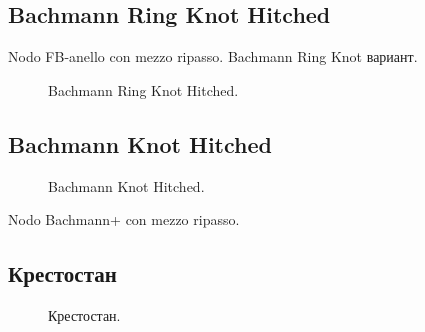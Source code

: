 \subsection{Bachmann Ring Knot Hitched}

Nodo FB-anello con mezzo ripasso. Bachmann Ring Knot вариант.

\begin{figure}[H]\centering
	\begin{minipage}{1\linewidth}
		\begin{center}
			\tcbox[enhanced jigsaw,colframe=black,opacityframe=0.5,opacityback=0.5]
			{\centering{}}
		\end{center}
	\end{minipage}
\caption{Bachmann Ring Knot Hitched.}
\label{ris:Bachmann_Ring_Knot_Hitched}
\end{figure}

\subsection{Bachmann Knot Hitched}

\begin{figure}[H]\centering
	\begin{minipage}{1\linewidth}
		\begin{center}
			\tcbox[enhanced jigsaw,colframe=black,opacityframe=0.5,opacityback=0.5]
			{\centering{}}
		\end{center}
	\end{minipage}
\caption{Bachmann Knot Hitched.}
\label{ris:Bachmann_Knot_Hitched}
\end{figure}

Nodo Bachmann+ con mezzo ripasso.

\subsection{Крестостан}

\begin{figure}[H]\centering
	\begin{minipage}{1\linewidth}
		\begin{center}
			\tcbox[enhanced jigsaw,colframe=black,opacityframe=0.5,opacityback=0.5]
			{\centering{}}
		\end{center}
	\end{minipage}
\caption{Крестостан.}
\label{ris:Krestostan}
\end{figure}

